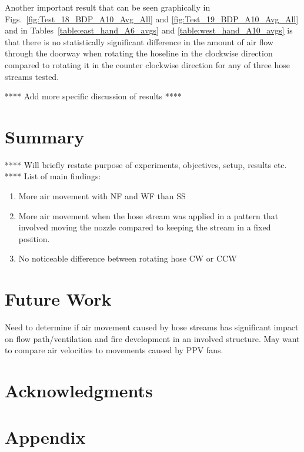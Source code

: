 \documentclass[12pt,oneside]{book}
\begin{document}
Another important result that can be seen graphically in Figs.~\ref{fig:Test_18_BDP_A10_Avg_All} and \ref{fig:Test_19_BDP_A10_Avg_All} and in Tables~\ref{table:east_hand_A6_avgs} and \ref{table:west_hand_A10_avgs} is that there is no statistically significant difference in the amount of air flow through the doorway when rotating the hoseline in the clockwise direction compared to rotating it in the counter clockwise direction for any of three hose streams tested. 

**** Add more specific discussion of results **** 


\chapter{Summary}
\label{chap:summary}
**** Will briefly restate purpose of experiments, objectives, setup, results etc. ****
List of main findings:
\begin{enumerate}
\item More air movement with NF and WF than SS
\item More air movement when the hose stream was applied in a pattern that involved moving the nozzle compared to keeping the stream in a fixed position.
\item No noticeable difference between rotating hose CW or CCW
\end{enumerate}

\chapter{Future Work}
\label{chap:Future_Work}
Need to determine if air movement caused by hose streams has significant impact on flow path/ventilation and fire development in an involved structure. May want to compare air velocities to movements caused by PPV fans.

\chapter{Acknowledgments}
\label{chap:acknowledgments}



\appendix
\chapter{Appendix}
\label{chap:appendix}
\end{document}
